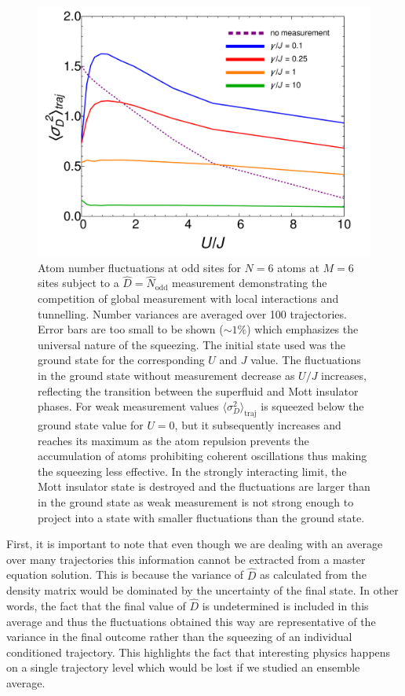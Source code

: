 \begin{figure}[htbp!]
  \centering
  \includegraphics[width=\textwidth]{Squeezing}
  \caption[Squeezing in the presence of Interactions]{Atom number
    fluctuations at odd sites for $N = 6$ atoms at $M = 6$ sites
    subject to a $\hat{D} = \hat{N}_\mathrm{odd}$ measurement
    demonstrating the competition of global measurement with local
    interactions and tunnelling. Number variances are averaged over
    100 trajectories. Error bars are too small to be shown ($\sim
    1\%$) which emphasizes the universal nature of the squeezing. The
    initial state used was the ground state for the corresponding $U$
    and $J$ value. The fluctuations in the ground state without
    measurement decrease as $U / J$ increases, reflecting the
    transition between the superfluid and Mott insulator phases. For
    weak measurement values $\langle \sigma^2_D \rangle_\mathrm{traj}$
    is squeezed below the ground state value for $U = 0$, but it
    subsequently increases and reaches its maximum as the atom
    repulsion prevents the accumulation of atoms prohibiting coherent
    oscillations thus making the squeezing less effective. In the
    strongly interacting limit, the Mott insulator state is destroyed
    and the fluctuations are larger than in the ground state as weak
    measurement is not strong enough to project into a state with
    smaller fluctuations than the ground state.}
  \label{fig:squeezing}
\end{figure}

First, it is important to note that even though we are dealing with an
average over many trajectories this information cannot be extracted
from a master equation solution. This is because the variance of
$\hat{D}$ as calculated from the density matrix would be dominated by
the uncertainty of the final state. In other words, the fact that the
final value of $\hat{D}$ is undetermined is included in this average
and thus the fluctuations obtained this way are representative of the
variance in the final outcome rather than the squeezing of an
individual conditioned trajectory. This highlights the fact that
interesting physics happens on a single trajectory level which would
be lost if we studied an ensemble average.


